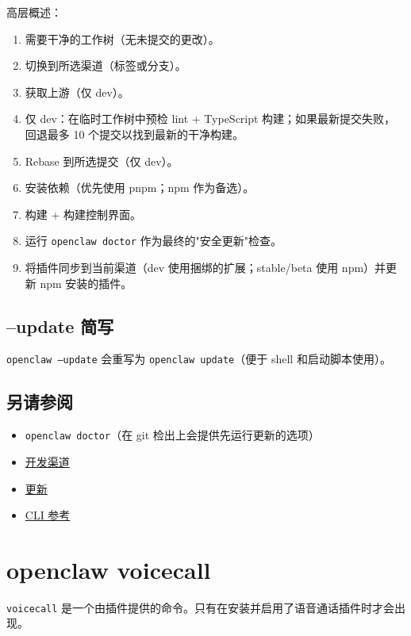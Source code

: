 高层概述：

\begin{enumerate}
  \item 需要干净的工作树（无未提交的更改）。
  \item 切换到所选渠道（标签或分支）。
  \item 获取上游（仅 dev）。
  \item 仅 dev：在临时工作树中预检 lint + TypeScript 构建；如果最新提交失败，回退最多 10 个提交以找到最新的干净构建。
  \item Rebase 到所选提交（仅 dev）。
  \item 安装依赖（优先使用 pnpm；npm 作为备选）。
  \item 构建 + 构建控制界面。
  \item 运行 \texttt{openclaw doctor} 作为最终的"安全更新"检查。
  \item 将插件同步到当前渠道（dev 使用捆绑的扩展；stable/beta 使用 npm）并更新 npm 安装的插件。
\end{enumerate}


\subsection{--update 简写}


\texttt{openclaw --update} 会重写为 \texttt{openclaw update}（便于 shell 和启动脚本使用）。

\subsection{另请参阅}


\begin{itemize}
  \item \texttt{openclaw doctor}（在 git 检出上会提供先运行更新的选项）
  \item \href{/install/development-channels}{开发渠道}
  \item \href{/install/updating}{更新}
  \item \href{/cli}{CLI 参考}
\end{itemize}



\clearpage

\section{openclaw voicecall}


\texttt{voicecall} 是一个由插件提供的命令。只有在安装并启用了语音通话插件时才会出现。

